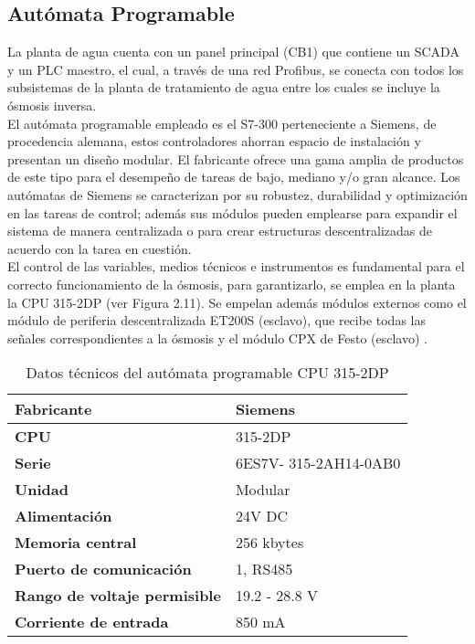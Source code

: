 \subsection{ Autómata Programable}
La planta de agua cuenta con un panel principal (CB1) que contiene un
SCADA y un PLC maestro, el cual, a través de una red Profibus, se conecta con
todos los subsistemas de la planta de tratamiento de agua entre los cuales se
incluye la ósmosis inversa.\\

El autómata programable empleado es el S7-300 perteneciente a
Siemens, de procedencia alemana, estos controladores ahorran espacio de
instalación y presentan un diseño modular. El fabricante ofrece una gama amplia
de productos de este tipo para el desempeño de tareas de bajo, mediano y/o
gran alcance. Los autómatas de Siemens se caracterizan por su robustez,
durabilidad y optimización en las tareas de control; además sus módulos pueden
emplearse para expandir el sistema de manera centralizada o para crear
estructuras descentralizadas de acuerdo con la tarea en cuestión.\\

El control de las variables, medios técnicos e instrumentos es fundamental
para el correcto funcionamiento de la ósmosis, para garantizarlo, se emplea en
la planta la CPU 315-2DP (ver Figura 2.11). Se empelan además módulos
externos como el módulo de periferia descentralizada ET200S (esclavo), que
recibe todas las señales correspondientes a la ósmosis y el módulo CPX de
Festo (esclavo) .\\



\renewcommand{\arraystretch}{2}
\begin{table}[H]
    \centering
    \caption{Datos técnicos del autómata programable CPU 315-2DP}
    \label{table:automata}
    \begin{tabular}{| L{5cm} | L{5cm} |}
        \hline
        \textbf{Fabricante} & Siemens  \\
        \hline
        \textbf{CPU} & 315-2DP  \\
        \hline
        \textbf{Serie} & 6ES7V- 315-2AH14-0AB0  \\
        \hline
        \textbf{Unidad} & Modular \\
        \hline
        \textbf{Alimentación} & 24V DC  \\
        \hline
        \textbf{Memoria central} & 256 kbytes  \\
        \hline
        \textbf{Puerto de comunicación} & 1, RS485  \\
        \hline
        \textbf{Rango de voltaje permisible} & 19.2 - 28.8 V  \\
        \hline
        \textbf{Corriente de entrada} & 850 mA  \\
        \hline
    \end{tabular}
\end{table}


